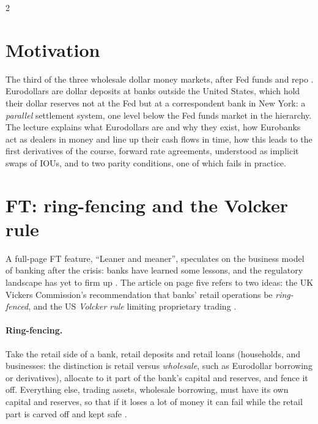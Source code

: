 \begin{paracol}{2}
\section*{Motivation}
The third of the three wholesale dollar money markets, after Fed funds and repo . Eurodollars are dollar deposits at banks outside
the United States, which hold their dollar reserves not at the Fed but at a correspondent bank in New York: a \emph{parallel} settlement system, one
level below the Fed funds market in the hierarchy. The lecture explains what Eurodollars are and why they exist, how Eurobanks act as dealers in money
and line up their cash flows in time, how this leads to the first derivatives of the course, forward rate agreements, understood as implicit swaps of
IOUs, and to two parity conditions, one of which fails in practice.

\section{FT: ring-fencing and the Volcker rule}\label{sec:ed-ft}

\begin{casestudy}
A full-page FT feature, ``Leaner and meaner'', speculates on the business model of banking after the crisis: banks have learned some lessons, and the
regulatory landscape has yet to firm up . The article on page five refers to two ideas: the UK Vickers Commission's
recommendation that banks' retail operations be \emph{ring-fenced}, and the US \emph{Volcker rule} limiting proprietary trading .
\end{casestudy}

\paragraph{Ring-fencing.} Take the retail side of a bank, retail deposits and retail loans (households, and businesses: the distinction is retail versus
\emph{wholesale}, such as Eurodollar borrowing or derivatives), allocate to it part of the bank's capital and reserves, and fence it off. Everything else,
trading assets, wholesale borrowing, must have its own capital and reserves, so that if it loses a lot of money it can fail while the retail part is carved
off and kept safe .


\end{paracol}
